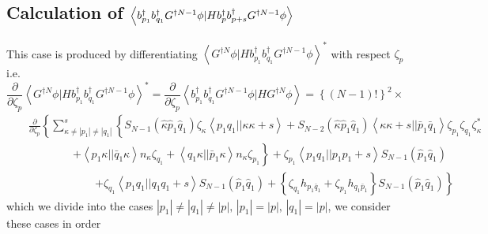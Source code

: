 \subsection{Calculation of $\left\langle b_{p_{1}}^{\dagger
}b_{q_{1}}^{\dagger }G^{\dagger N-1}\protect\phi |Hb_{p}^{\dagger
}b_{p+s}^{\dagger }G^{\dagger N-1}\protect\phi \right\rangle $}

This case is produced by differentiating $\left\langle G^{\dagger N}\phi
|Hb_{p_{1}}^{\dagger }b_{q_{1}}^{\dagger }G^{\dagger N-1}\phi \right\rangle
^{\ast }$ with respect $\zeta _{p}$ i.e. 
\[
\frac{\partial }{\partial \zeta _{p}}\left\langle G^{\dagger N}\phi
|Hb_{p_{1}}^{\dagger }b_{q_{1}}^{\dagger }G^{\dagger N-1}\phi \right\rangle
^{\ast }=\frac{\partial }{\partial \zeta _{p}}\left\langle
b_{p_{1}}^{\dagger }b_{q_{1}}^{\dagger }G^{\dagger N-1}\phi |HG^{\dagger
N}\phi \right\rangle =\left\{ \left( N-1\right) !\right\} ^{2}\times \qquad
\qquad 
\]%
\begin{eqnarray}
&&\frac{\partial }{\partial \zeta _{p}}\left\{ \sum_{\kappa \neq \left|
p_{1}\right| \neq \left| q_{1}\right| }^{s}\left\{ S_{N-1}\left( \hat{\kappa}%
\hat{p}_{1}\hat{q}_{1}\right) \zeta _{\kappa }\left\langle
p_{1}q_{1}||\kappa \kappa +s\right\rangle +S_{N-2}\left( \hat{\kappa}\hat{p}%
_{1}\hat{q}_{1}\right) \left\langle \kappa \kappa +s||\bar{p}_{1}\bar{q}%
_{1}\right\rangle \zeta _{p_{1}}\zeta _{q_{1}}\zeta _{\kappa }^{\ast
}\right. \right.  \nonumber \\
&&\quad \quad \quad \quad \left. +\left\langle p_{1}\kappa ||\bar{q}%
_{1}\kappa \right\rangle n_{\kappa }\zeta _{q_{1}}+\left\langle q_{1}\kappa
||\bar{p}_{1}\kappa \right\rangle n_{\kappa }\zeta _{p_{1}}\right\} +\zeta
_{p_{1}}\left\langle p_{1}q_{1}||p_{1}p_{1}+s\right\rangle S_{N-1}\left( 
\hat{p}_{1}\hat{q}_{1}\right)  \nonumber \\
&&\quad \quad \quad \quad \qquad \left. +\zeta _{q_{1}}\left\langle
p_{1}q_{1}||q_{1}q_{1}+s\right\rangle S_{N-1}\left( \hat{p}_{1}\hat{q}%
_{1}\right) +\left\{ \zeta _{q_{1}}h_{p_{1}\bar{q}_{1}}+\zeta
_{p_{1}}h_{q_{1}\bar{p}_{1}}\right\} S_{N-1}\left( \hat{p}_{1}\hat{q}%
_{1}\right) \right\}
\end{eqnarray}%
which we divide into the cases $\left| p_{1}\right| \neq \left| q_{1}\right|
\neq \left| p\right| ,\,\left| p_{1}\right| =\left| p\right| ,\,\left|
q_{1}\right| =\left| p\right| $, we consider these cases in order

